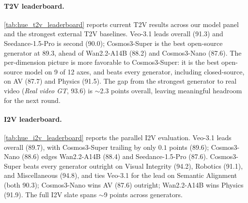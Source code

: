 \paragraph{T2V leaderboard.} \cref{tab:hue_t2v_leaderboard} reports current T2V results across our model panel and the strongest external T2V baselines. Veo-3.1 leads overall (91.3) and Seedance-1.5-Pro is second (90.0); Cosmos3-Super is the best open-source generator at 89.3, ahead of Wan2.2-A14B (88.2) and Cosmos3-Nano (87.6). The per-dimension picture is more favorable to Cosmos3-Super: it is the best open-source model on 9 of 12 axes, and beats every generator, including closed-source, on AV (87.7) and Physics (91.5). The gap from the strongest generator to real video (\emph{Real video GT}, 93.6) is $\sim$2.3 points overall, leaving meaningful headroom for the next round.

\paragraph{I2V leaderboard.} \cref{tab:hue_i2v_leaderboard} reports the parallel I2V evaluation. Veo-3.1 leads overall (89.7), with Cosmos3-Super trailing by only $0.1$ points (89.6);
Cosmos3-Nano (88.6) edges Wan2.2-A14B (88.4) and Seedance-1.5-Pro (87.6). Cosmos3-Super beats every generator outright on Visual Integrity (94.2), Robotics (91.1), and Miscellaneous
(94.8), and ties Veo-3.1 for the lead on Semantic Alignment (both 90.3); Cosmos3-Nano wins AV (87.6) outright; Wan2.2-A14B wins Physics (91.9). The full I2V slate spans $\sim$9 points
across generators.

